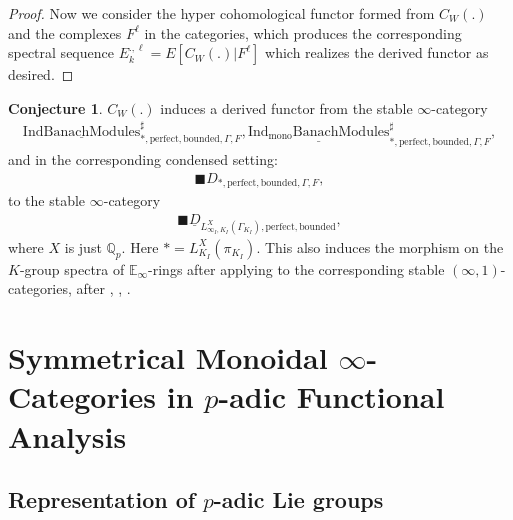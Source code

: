 \documentclass[12pt]{article}
\theoremstyle{definition}
\newtheorem{conjecture}{Conjecture}
\begin{document}
\begin{proof}
Now we consider the hyper cohomological functor formed from $C_{W}(.)$ and the complexes $F^\ell$ in the categories, which produces the corresponding spectral sequence $E_k^{.,\ell}=E[C_{W}(.)|F^\ell]$ which realizes the derived functor as desired.
\end{proof}

\begin{conjecture}
$C_{W}(.)$ induces a derived functor from the stable $\infty$-category 
\begin{align}
\underline{\mathrm{IndBanachModules}}^\sharp_{*,\mathrm{perfect},\mathrm{bounded},\Gamma,F}, \underline{\mathrm{Ind_{\mathrm{mono}}BanachModules}}^\sharp_{*,\mathrm{perfect},\mathrm{bounded},\Gamma,F},
\end{align}
and in the corresponding condensed setting:
\begin{align}
\blacksquare D_{*,\mathrm{perfect},\mathrm{bounded},\Gamma,F},
\end{align}
to the stable $\infty$-category 
\begin{align}
\blacksquare\underline{D}_{L^X_{\infty_I,K_I}(\Gamma_{K_I}),\mathrm{perfect},\mathrm{bounded}},
\end{align}
where $X$ is just $\mathbb{Q}_p$. Here $*=L_{K_I}^X(\pi_{K_I})$. This also induces the morphism on the $K$-group spectra of $\mathbb{E}_\infty$-rings after applying \cite{BGT} to the corresponding stable $(\infty,1)$-categories, after \cite{G2}, \cite{A2}, \cite{BGT}.
\end{conjecture}



\newpage
\section{Symmetrical Monoidal $\infty$-Categories in $p$-adic Functional Analysis}

\subsection{Representation of $p$-adic Lie groups}
\end{document}
